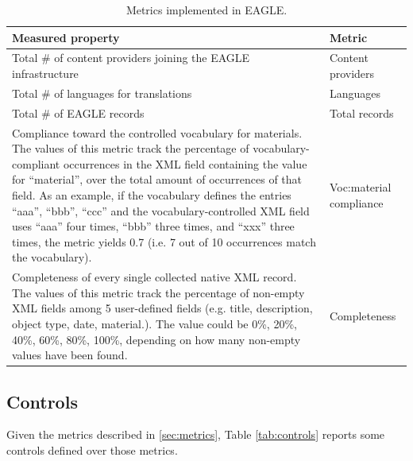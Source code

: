 \documentclass[amsthm,ebook]{saparticle}
\begin{document}
\begin{table}
{\small
\addtolength{\tabcolsep}{-0.5mm}
\begin{tabular*}{\textwidth}{ l l }
\toprule
Measured property & Metric\\
\midrule
\parbox[t]{0.6\textwidth}{Total \# of content providers joining the EAGLE infrastructure} & Content providers\\
Total \# of languages for translations & Languages\\
Total \# of EAGLE records & Total records\\
\parbox[t]{0.6\textwidth}{Compliance toward the controlled vocabulary for materials. The values of this metric track the percentage of vocabulary-compliant occurrences in the XML field containing the value for ``material'', over the total amount of occurrences of that field. As an example, if the vocabulary defines the entries ``aaa'', ``bbb'', ``ccc'' and the vocabulary-controlled XML field uses ``aaa'' four times, ``bbb'' three times, and ``xxx'' three times, the metric yields 0.7 (i.e. 7 out of 10 occurrences match the vocabulary).} & Voc:material compliance\\
\parbox[t]{0.6\textwidth}{Completeness of every single collected native XML record. The values of this metric track the percentage of non-empty XML fields among 5 user-defined fields (e.g. title, description, object type, date, material.). The value could be 0\%, 20\%, 40\%, 60\%, 80\%, 100\%, depending on how many non-empty values have been found.} & Completeness\\
\bottomrule
\end{tabular*}}
\caption{Metrics implemented in EAGLE.}
\label{tab:metrics}
\end{table}


\subsection{Controls}\label{sec:controls}

Given the metrics described in \ref{sec:metrics}, Table \ref{tab:controls} reports some controls defined over those metrics.
\end{document}
